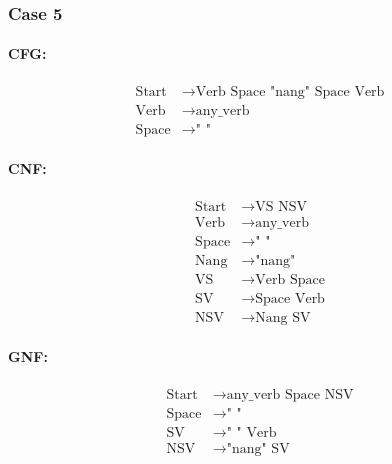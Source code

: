 \subsubsection{Case 5}

\paragraph{CFG:}

\begin{equation*}
    \begin{aligned}
        \text{Start} & \rightarrow \text{Verb Space "nang" Space Verb} \\
        \text{Verb}  & \rightarrow \text{any\_verb}                    \\
        \text{Space} & \rightarrow \text{" "}
    \end{aligned}
\end{equation*}

\paragraph{CNF:}

\begin{equation*}
    \begin{aligned}
        \text{Start} & \rightarrow \text{VS NSV}     \\
        \text{Verb}  & \rightarrow \text{any\_verb}  \\
        \text{Space} & \rightarrow \text{" "}        \\
        \text{Nang}  & \rightarrow \text{"nang"}     \\
        \text{VS}    & \rightarrow \text{Verb Space} \\
        \text{SV}    & \rightarrow \text{Space Verb} \\
        \text{NSV}   & \rightarrow \text{Nang SV}
    \end{aligned}
\end{equation*}

\paragraph{GNF:}

\begin{equation*}
    \begin{aligned}
        \text{Start} & \rightarrow \text{any\_verb Space NSV} \\
        \text{Space} & \rightarrow \text{" "}                 \\
        \text{SV}    & \rightarrow \text{" " Verb}            \\
        \text{NSV}   & \rightarrow \text{"nang" SV}
    \end{aligned}
\end{equation*}